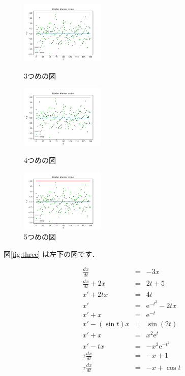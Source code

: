 \documentclass[a4paper,11pt,dvipdfmx]{jarticle}
\begin{document}
\begin{figure}[htbp]
 \begin{minipage}{0.33\hsize}
  \begin{center}
   \includegraphics[width=40mm]{fig_hmm212.pdf}
  \end{center}
  \caption{3つめの図}
  \label{fig:three}
 \end{minipage}
 \begin{minipage}{0.33\hsize}
 \begin{center}
  \includegraphics[width=40mm]{fig_hmm212.pdf}
 \end{center}
  \caption{4つめの図}
  \label{fig:four}
 \end{minipage}
 \begin{minipage}{0.33\hsize}
 \begin{center}
  \includegraphics[width=40mm]{fig_hmm212.pdf}
 \end{center}
  \caption{5つめの図}
  \label{fig:five}
 \end{minipage}
\end{figure}


図\ref{fig:three} は左下の図です．

\lhead{}
\rhead{}


\begin{eqnarray}
\frac{dx}{dt}   & = &  - 3x \\
\frac{dx}{dt}  +2x  & = & 2t + 5 \\
x' + 2tx & = & 4t  \\
x' & = & \mathrm{e}^{-t^2} -2tx \\
x' + x & = &  \mathrm{e}^{-t} \\
x' - (\sin t) x  & = &  \sin (2t) \\
x' + x  & = &  x^2 \mathrm{e}^t \\
x' - tx   & = &  - x^3 \mathrm{e}^{-t^2}  \\
\tau \frac{dx}{dt} & = &   -x + 1 \\
\tau \frac{dx}{dt} & = &   -x + \cos t 
\end{eqnarray}
\end{document}
